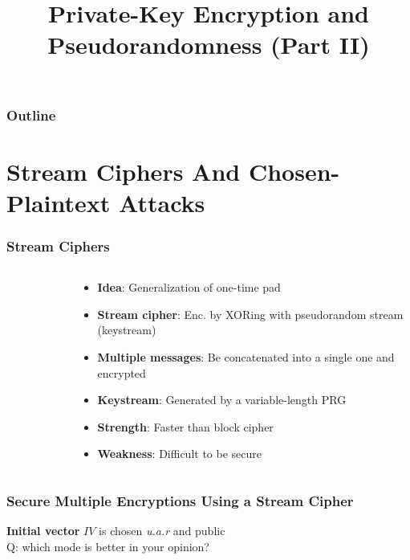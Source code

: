 

\title{Private-Key Encryption and Pseudorandomness (Part II)}


\maketitle
\begin{frame}
\frametitle{Outline}
\tableofcontents
\end{frame}
\section{Stream Ciphers And Chosen-Plaintext Attacks}
\begin{frame}\frametitle{Stream Ciphers}
\begin{columns}[t]
\begin{column}{4cm}
\begin{figure}
\begin{center}

\end{center}
\end{figure}
\end{column}
\begin{column}{7cm}
\begin{itemize}
\item \textbf{Idea}: Generalization of one-time pad
\item \textbf{Stream cipher}: Enc. by XORing with pseudorandom stream (keystream)
\item \textbf{Multiple messages}: Be concatenated into a single one and encrypted
\item \textbf{Keystream}: Generated by a variable-length PRG
\item \textbf{Strength}: Faster than block cipher
\item \textbf{Weakness}: Difficult to be secure
\end{itemize}
\end{column}
\end{columns}
\end{frame}
\begin{frame}\frametitle{Secure Multiple Encryptions Using a Stream Cipher}
\begin{figure}
\begin{center}

\end{center}
\end{figure}
\textbf{Initial vector} $IV$ is chosen \emph{u.a.r} and public\\
\alert{Q: which mode is better in your opinion?}
\end{frame}
